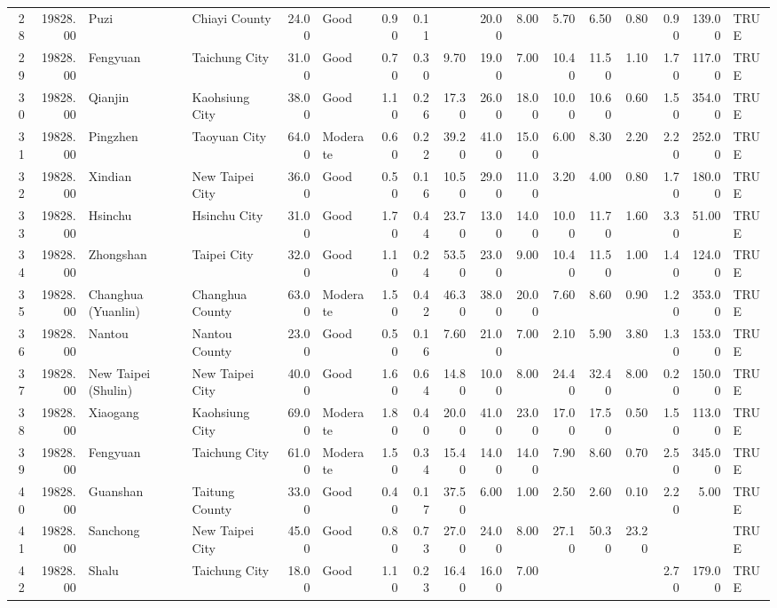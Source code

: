 \begin{table}[ht]
\begin{tabular}{rrllrlrrrrrrrrrrl}
  28 & 19828.00 & Puzi & Chiayi County & 24.00 & Good & 0.90 & 0.11 &  & 20.00 & 8.00 & 5.70 & 6.50 & 0.80 & 0.90 & 139.00 & TRUE \\ 
  29 & 19828.00 & Fengyuan & Taichung City & 31.00 & Good & 0.70 & 0.30 & 9.70 & 19.00 & 7.00 & 10.40 & 11.50 & 1.10 & 1.70 & 117.00 & TRUE \\ 
  30 & 19828.00 & Qianjin & Kaohsiung City & 38.00 & Good & 1.10 & 0.26 & 17.30 & 26.00 & 18.00 & 10.00 & 10.60 & 0.60 & 1.50 & 354.00 & TRUE \\ 
  31 & 19828.00 & Pingzhen & Taoyuan City & 64.00 & Moderate & 0.60 & 0.22 & 39.20 & 41.00 & 15.00 & 6.00 & 8.30 & 2.20 & 2.20 & 252.00 & TRUE \\ 
  32 & 19828.00 & Xindian & New Taipei City & 36.00 & Good & 0.50 & 0.16 & 10.50 & 29.00 & 11.00 & 3.20 & 4.00 & 0.80 & 1.70 & 180.00 & TRUE \\ 
  33 & 19828.00 & Hsinchu & Hsinchu City & 31.00 & Good & 1.70 & 0.44 & 23.70 & 13.00 & 14.00 & 10.00 & 11.70 & 1.60 & 3.30 & 51.00 & TRUE \\ 
  34 & 19828.00 & Zhongshan & Taipei City & 32.00 & Good & 1.10 & 0.24 & 53.50 & 23.00 & 9.00 & 10.40 & 11.50 & 1.00 & 1.40 & 124.00 & TRUE \\ 
  35 & 19828.00 & Changhua (Yuanlin) & Changhua County & 63.00 & Moderate & 1.50 & 0.42 & 46.30 & 38.00 & 20.00 & 7.60 & 8.60 & 0.90 & 1.20 & 353.00 & TRUE \\ 
  36 & 19828.00 & Nantou & Nantou County & 23.00 & Good & 0.50 & 0.16 & 7.60 & 21.00 & 7.00 & 2.10 & 5.90 & 3.80 & 1.30 & 153.00 & TRUE \\ 
  37 & 19828.00 & New Taipei (Shulin) & New Taipei City & 40.00 & Good & 1.60 & 0.64 & 14.80 & 10.00 & 8.00 & 24.40 & 32.40 & 8.00 & 0.20 & 150.00 & TRUE \\ 
  38 & 19828.00 & Xiaogang & Kaohsiung City & 69.00 & Moderate & 1.80 & 0.40 & 20.00 & 41.00 & 23.00 & 17.00 & 17.50 & 0.50 & 1.50 & 113.00 & TRUE \\ 
  39 & 19828.00 & Fengyuan & Taichung City & 61.00 & Moderate & 1.50 & 0.34 & 15.40 & 14.00 & 14.00 & 7.90 & 8.60 & 0.70 & 2.50 & 345.00 & TRUE \\ 
  40 & 19828.00 & Guanshan & Taitung County & 33.00 & Good & 0.40 & 0.17 & 37.50 & 6.00 & 1.00 & 2.50 & 2.60 & 0.10 & 2.20 & 5.00 & TRUE \\ 
  41 & 19828.00 & Sanchong & New Taipei City & 45.00 & Good & 0.80 & 0.73 & 27.00 & 24.00 & 8.00 & 27.10 & 50.30 & 23.20 &  &  & TRUE \\ 
  42 & 19828.00 & Shalu & Taichung City & 18.00 & Good & 1.10 & 0.23 & 16.40 & 16.00 & 7.00 &  &  &  & 2.70 & 179.00 & TRUE \\ 

\end{tabular}
\end{table}
